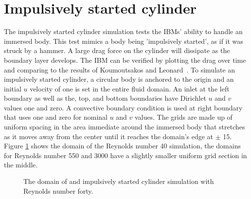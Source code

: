 \documentclass[onehalf,11pt]{beavtex}
\begin{document}
\section{Impulsively started cylinder}
The impulsively started cylinder simulation tests the IBMs' ability to handle an immersed body.
This test mimics a body being 'impulsively started', as if it was struck by a hammer.
A large drag force on the cylinder will dissipate as the boundary layer develops.
The IBM can be verified by plotting the drag over time and comparing to the results of Koumoutsakos and Leonard~\cite{Koumoutsakos:1995bf}.
To simulate an impulsively started cylinder, a circular body is anchored to the origin and an initial $u$ velocity of one is set in the entire fluid domain.
An inlet at the left boundary as well as the, top, and bottom boundaries have  Dirichlet $u$ and $v$ values one and zero.
A convective boundary condition is used at right boundary that uses one and zero for nominal $u$ and $v$ values.
The grids are made up of uniform spacing in the area immediate around the immersed body that stretches as it moves away from the center until it reaches the domain's edge at $\pm$ 15.
Figure \ref{fig:iscylinder} shows the domain of the Reynolds number 40 simulation, the domains for Reynolds number 550 and 3000 have a slightly smaller uniform grid section in the middle.
\begin{figure}[h]
	\centering
	
	\label{fig:iscylinder}
	\caption{The domain of and impulsively started cylinder simulation with Reynolds number forty.}
\end{figure}
\end{document}
